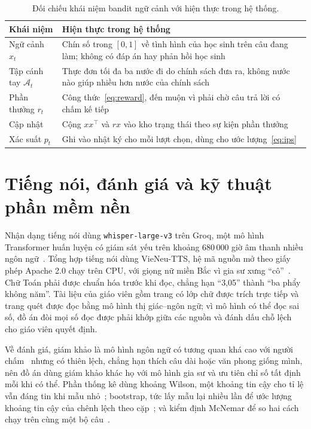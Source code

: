 \begin{table}[H]
\centering
\caption{Đối chiếu khái niệm bandit ngữ cảnh với hiện thực trong hệ thống.}
\label{tab:bandit-mapping}
\small
\begin{tabularx}{\linewidth}{@{}p{3.0cm}X@{}}
\toprule
Khái niệm & Hiện thực trong hệ thống \\
\midrule
Ngữ cảnh $x_t$ & Chín số trong $[0,1]$ về tình hình của học sinh trên câu đang làm; không có đáp án hay phản hồi học sinh \\
Tập cánh tay $\mathcal{A}_t$ & Thực đơn tối đa ba nước đi do chính sách đưa ra, không nước nào giúp nhiều hơn nước của chính sách \\
Phần thưởng $r_t$ & Công thức~\eqref{eq:reward}, đến muộn vì phải chờ câu trả lời có chấm kế tiếp \\
Cập nhật & Cộng $xx^{\top}$ và $rx$ vào kho trạng thái theo sự kiện phần thưởng \\
Xác suất $p_t$ & Ghi vào nhật ký cho mỗi lượt chọn, dùng cho ước lượng~\eqref{eq:ips} \\
\bottomrule
\end{tabularx}
\end{table}

\section{Tiếng nói, đánh giá và kỹ thuật phần mềm nền}
Nhận dạng tiếng nói dùng \texttt{whisper-large-v3} trên Groq, một mô hình Transformer huấn luyện có giám sát yếu trên khoảng 680\,000 giờ âm thanh nhiều ngôn ngữ~\cite{radford2023}. Tổng hợp tiếng nói dùng VieNeu-TTS, hệ mã nguồn mở theo giấy phép Apache 2.0 chạy trên CPU, với giọng nữ miền Bắc vì gia sư xưng ``cô''~\cite{vieneu}. Chữ Toán phải được chuẩn hóa trước khi đọc, chẳng hạn ``3,05'' thành ``ba phẩy không năm''. Tài liệu của giáo viên gồm trang có lớp chữ được trích trực tiếp và trang quét được đọc bằng mô hình thị giác--ngôn ngữ; vì mô hình có thể đọc sai số, đồ án đòi mọi số đọc được phải khớp giữa các nguồn và đánh dấu chỗ lệch cho giáo viên quyết định.

Về đánh giá, giám khảo là mô hình ngôn ngữ có tương quan khá cao với người chấm~\cite{zheng2023} nhưng có thiên lệch, chẳng hạn thích câu dài hoặc văn phong giống mình, nên đồ án dùng giám khảo khác họ với mô hình gia sư và ưu tiên chỉ số tất định mỗi khi có thể. Phần thống kê dùng khoảng Wilson, một khoảng tin cậy cho tỉ lệ vẫn đáng tin khi mẫu nhỏ~\cite{wilson1927}; bootstrap, tức lấy mẫu lại nhiều lần để ước lượng khoảng tin cậy của chênh lệch theo cặp~\cite{efron1993}; và kiểm định McNemar để so hai cách chạy trên cùng một bộ câu~\cite{mcnemar1947,dror2018}.

